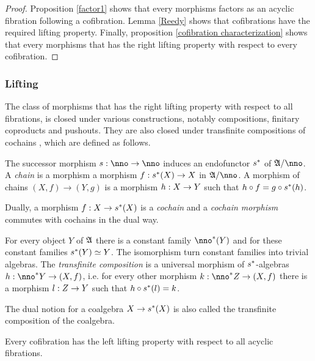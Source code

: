 \documentclass[csh.tex]{subfiles}
\begin{document}
\begin{proof} Proposition \ref{factor1} shows that every morphisms factors as an acyclic fibration following a cofibration. Lemma \ref{Reedy} shows that cofibrations have the required lifting property. Finally, proposition \ref{cofibration characterization} shows that every morphisms that has the right lifting property with respect to every cofibration.
\end{proof}


\subsubsection{Lifting}
The class of morphisms that has the right lifting property with respect to all fibrations, is closed under various constructions, notably compositions, finitary coproducts and pushouts. They are also closed under transfinite compositions of cochains , which are defined as follows.

\begin{definition} The successor morphism $s\of\nno\to\nno$ induces an endofunctor $s^*$ of $\ambient/\nno$. A \emph{chain} is a morphism a morphism $f: s^*(X)\to X$ in $\ambient/\nno$.  A morphism of chains $(X,f)\to(Y,g)$ is a morphism $h: X\to Y$ such that $h\circ f = g\circ s^*(h)$.

Dually, a morphism $f: X\to s^*(X)$ is a \emph{cochain} and a \emph{cochain morphism} commutes with cochains in the dual way.

For every object $Y$ of $\mathfrak A$ there is a constant family $\nno\ri(Y)$ and for these constant families $s^*(Y)\simeq Y$. The isomorphism turn constant families into trivial algebras. The \emph{transfinite composition} is a universal morphism of $s^*$-algebras $h\of \nno\ri Y\to (X,f)$, i.e. for every other morphism $k\of \nno\ri Z\to (X,f)$ there is a morphism $l: Z\to Y$ such that $h\circ s^*(l)=k$.

The dual notion for a coalgebra $X\to s^*(X)$ is also called the transfinite composition of the coalgebra.
\end{definition}

\begin{lemma} Every cofibration has the left lifting property with respect to all acyclic fibrations. \label{Reedy}\end{lemma}
\end{document}
